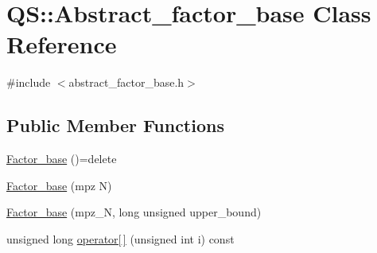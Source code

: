\hypertarget{classQS_1_1Abstract__factor__base}{\section{Q\-S\-:\-:Abstract\-\_\-factor\-\_\-base Class Reference}
\label{classQS_1_1Abstract__factor__base}
}


{\ttfamily \#include $<$abstract\-\_\-factor\-\_\-base.\-h$>$}

\subsection*{Public Member Functions}
\begin{DoxyCompactItemize}
\item 
\hyperlink{classQS_1_1Abstract__factor__base_a4da1623e950d7b5c06c5fe97ac456128}{Factor\-\_\-base} ()=delete
\item 
\hyperlink{classQS_1_1Abstract__factor__base_aadb4a0cdf030ba498eefca786636b6ad}{Factor\-\_\-base} (mpz N)
\item 
\hyperlink{classQS_1_1Abstract__factor__base_a8ded77da72ff28d3df4bace87b88c22c}{Factor\-\_\-base} (mpz\-\_\-\-N, long unsigned upper\-\_\-bound)
\item 
unsigned long \hyperlink{classQS_1_1Abstract__factor__base_ab8d8550626cbd7290aed2e6669a09d41}{operator\mbox{[}$\,$\mbox{]}} (unsigned int i) const 
\end{DoxyCompactItemize}


